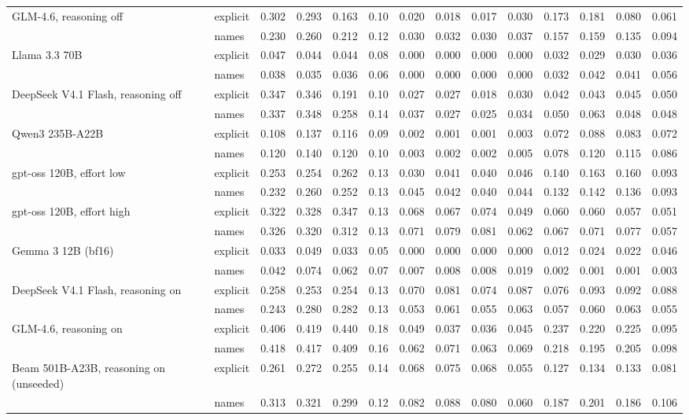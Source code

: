 \begin{tabular}{llrrrrrrrrrrrr}
GLM-4.6, reasoning off & explicit & 0.302 & 0.293 & 0.163 & 0.10 & 0.020 & 0.018 & 0.017 & 0.030 & 0.173 & 0.181 & 0.080 & 0.061 \\
 & names & 0.230 & 0.260 & 0.212 & 0.12 & 0.030 & 0.032 & 0.030 & 0.037 & 0.157 & 0.159 & 0.135 & 0.094 \\
Llama 3.3 70B & explicit & 0.047 & 0.044 & 0.044 & 0.08 & 0.000 & 0.000 & 0.000 & 0.000 & 0.032 & 0.029 & 0.030 & 0.036 \\
 & names & 0.038 & 0.035 & 0.036 & 0.06 & 0.000 & 0.000 & 0.000 & 0.000 & 0.032 & 0.042 & 0.041 & 0.056 \\
DeepSeek V4.1 Flash, reasoning off & explicit & 0.347 & 0.346 & 0.191 & 0.10 & 0.027 & 0.027 & 0.018 & 0.030 & 0.042 & 0.043 & 0.045 & 0.050 \\
 & names & 0.337 & 0.348 & 0.258 & 0.14 & 0.037 & 0.027 & 0.025 & 0.034 & 0.050 & 0.063 & 0.048 & 0.048 \\
Qwen3 235B-A22B & explicit & 0.108 & 0.137 & 0.116 & 0.09 & 0.002 & 0.001 & 0.001 & 0.003 & 0.072 & 0.088 & 0.083 & 0.072 \\
 & names & 0.120 & 0.140 & 0.120 & 0.10 & 0.003 & 0.002 & 0.002 & 0.005 & 0.078 & 0.120 & 0.115 & 0.086 \\
gpt-oss 120B, effort low & explicit & 0.253 & 0.254 & 0.262 & 0.13 & 0.030 & 0.041 & 0.040 & 0.046 & 0.140 & 0.163 & 0.160 & 0.093 \\
 & names & 0.232 & 0.260 & 0.252 & 0.13 & 0.045 & 0.042 & 0.040 & 0.044 & 0.132 & 0.142 & 0.136 & 0.093 \\
gpt-oss 120B, effort high & explicit & 0.322 & 0.328 & 0.347 & 0.13 & 0.068 & 0.067 & 0.074 & 0.049 & 0.060 & 0.060 & 0.057 & 0.051 \\
 & names & 0.326 & 0.320 & 0.312 & 0.13 & 0.071 & 0.079 & 0.081 & 0.062 & 0.067 & 0.071 & 0.077 & 0.057 \\
Gemma 3 12B (bf16) & explicit & 0.033 & 0.049 & 0.033 & 0.05 & 0.000 & 0.000 & 0.000 & 0.000 & 0.012 & 0.024 & 0.022 & 0.046 \\
 & names & 0.042 & 0.074 & 0.062 & 0.07 & 0.007 & 0.008 & 0.008 & 0.019 & 0.002 & 0.001 & 0.001 & 0.003 \\
DeepSeek V4.1 Flash, reasoning on & explicit & 0.258 & 0.253 & 0.254 & 0.13 & 0.070 & 0.081 & 0.074 & 0.087 & 0.076 & 0.093 & 0.092 & 0.088 \\
 & names & 0.243 & 0.280 & 0.282 & 0.13 & 0.053 & 0.061 & 0.055 & 0.063 & 0.057 & 0.060 & 0.063 & 0.055 \\
GLM-4.6, reasoning on & explicit & 0.406 & 0.419 & 0.440 & 0.18 & 0.049 & 0.037 & 0.036 & 0.045 & 0.237 & 0.220 & 0.225 & 0.095 \\
 & names & 0.418 & 0.417 & 0.409 & 0.16 & 0.062 & 0.071 & 0.063 & 0.069 & 0.218 & 0.195 & 0.205 & 0.098 \\
Beam 501B-A23B, reasoning on (unseeded) & explicit & 0.261 & 0.272 & 0.255 & 0.14 & 0.068 & 0.075 & 0.068 & 0.055 & 0.127 & 0.134 & 0.133 & 0.081 \\
 & names & 0.313 & 0.321 & 0.299 & 0.12 & 0.082 & 0.088 & 0.080 & 0.060 & 0.187 & 0.201 & 0.186 & 0.106 \\
\bottomrule
\end{tabular}
